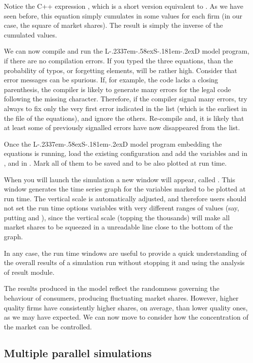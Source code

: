 \documentclass [11pt,a4paper] {book}
\def\LsD{{L\kern-.2337em\lower-.58ex\hbox{S}\kern-.181em\lower-.2ex\hbox{D}}\xspace}
\begin{document}
Notice the C++ expression , which is a short version equivalent to . As we have seen before, this equation simply cumulates in  some values for each firm (in our case, the square of market shares). The result is simply the inverse of the cumulated values.


We can now compile and run the \LsD model program, if there are no compilation errors. If you typed the three equations, than the probability of typos, or forgetting elements, will be rather high. Consider that error messages can be spurious. If, for example, the code lacks a closing parenthesis, the compiler is likely to generate many errors for the legal code following the missing character. Therefore, if the compiler signal many errors, try always to fix only the very first error indicated in the list (which is the earliest in the file of the equations), and ignore the others. Re-compile and, it is likely that at least some of previously signalled errors have now disappeared from the list.


Once the \LsD model program embedding the equations is running, load the existing configuration and add the variables  and  in , and  in . Mark all of them to be saved and  to be also plotted at run time.

When you will launch the simulation a new window will appear, called . This window generates the time series graph for the variables marked to be plotted at run time. The vertical scale is automatically adjusted, and therefore users should not set the run time options variables with very different ranges of values (say, putting  and ), since the vertical scale (topping the thousands) will make all market shares to be squeezed in a unreadable line close to the bottom of the graph.

In any case, the run time windows are useful to provide a quick understanding of the overall results of a simulation run without stopping it and using the analysis of result module.

The results produced in the model reflect the randomness governing the behaviour of consumers, producing fluctuating market shares. However, higher quality firms have consistently higher shares, on average, than lower quality ones, as we may have expected. We can now move to consider how the concentration of the market can be controlled.

\subsection{Multiple parallel simulations}
\end{document}
